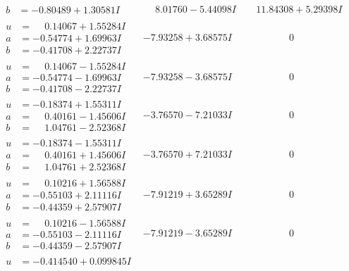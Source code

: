 \documentclass[1p]{elsarticle_modified}
\theoremstyle{definition}
\begin{document}
$$\begin{array}{c|c|c}
\begin{aligned}
b &= -0.80489 + 1.30581 I\end{aligned}
 & \phantom{-}8.01760 - 5.44098 I & \phantom{-}11.84308 + 5.29398 I \\ \hline\begin{aligned}
u &= \phantom{-}0.14067 + 1.55284 I \\
a &= -0.54774 + 1.69963 I \\
b &= -0.41708 + 2.22737 I\end{aligned}
 & -7.93258 + 3.68575 I & \phantom{-0.000000 } 0 \\ \hline\begin{aligned}
u &= \phantom{-}0.14067 - 1.55284 I \\
a &= -0.54774 - 1.69963 I \\
b &= -0.41708 - 2.22737 I\end{aligned}
 & -7.93258 - 3.68575 I & \phantom{-0.000000 } 0 \\ \hline\begin{aligned}
u &= -0.18374 + 1.55311 I \\
a &= \phantom{-}0.40161 - 1.45606 I \\
b &= \phantom{-}1.04761 - 2.52368 I\end{aligned}
 & -3.76570 - 7.21033 I & \phantom{-0.000000 } 0 \\ \hline\begin{aligned}
u &= -0.18374 - 1.55311 I \\
a &= \phantom{-}0.40161 + 1.45606 I \\
b &= \phantom{-}1.04761 + 2.52368 I\end{aligned}
 & -3.76570 + 7.21033 I & \phantom{-0.000000 } 0 \\ \hline\begin{aligned}
u &= \phantom{-}0.10216 + 1.56588 I \\
a &= -0.55103 + 2.11116 I \\
b &= -0.44359 + 2.57907 I\end{aligned}
 & -7.91219 + 3.65289 I & \phantom{-0.000000 } 0 \\ \hline\begin{aligned}
u &= \phantom{-}0.10216 - 1.56588 I \\
a &= -0.55103 - 2.11116 I \\
b &= -0.44359 - 2.57907 I\end{aligned}
 & -7.91219 - 3.65289 I & \phantom{-0.000000 } 0 \\ \hline\begin{aligned}
u &= -0.414540 + 0.099845 I \\

\end{aligned}
\end{array}$$
\end{document}
